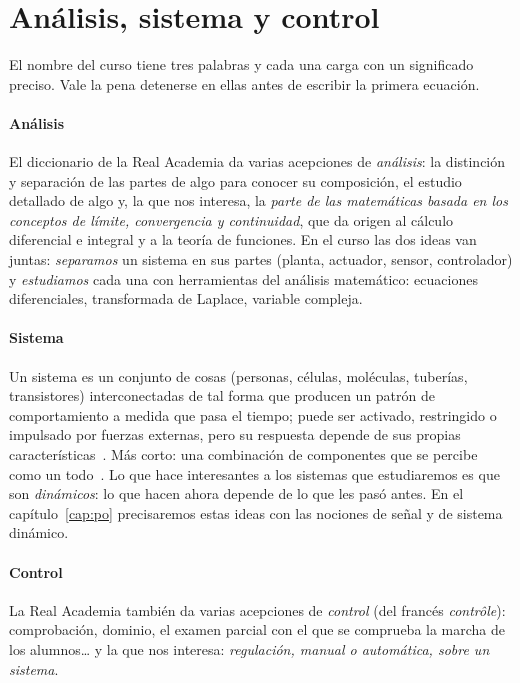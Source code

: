 \section{Análisis, sistema y control}
\label{sec:in-palabras}

El nombre del curso tiene tres palabras y cada una carga con un significado preciso. Vale la pena detenerse en ellas antes de escribir la primera ecuación.

\paragraph{Análisis}
El diccionario de la Real Academia da varias acepciones de \emph{análisis}: la distinción y separación de las partes de algo para conocer su composición, el estudio detallado de algo y, la que nos interesa, la \emph{parte de las matemáticas basada en los conceptos de límite, convergencia y continuidad}, que da origen al cálculo diferencial e integral y a la teoría de funciones. En el curso las dos ideas van juntas: \emph{separamos} un sistema en sus partes (planta, actuador, sensor, controlador) y \emph{estudiamos} cada una con herramientas del análisis matemático: ecuaciones diferenciales, transformada de Laplace, variable compleja.

\paragraph{Sistema}
Un sistema es un conjunto de cosas (personas, células, moléculas, tuberías, transistores) interconectadas de tal forma que producen un patrón de comportamiento a medida que pasa el tiempo; puede ser activado, restringido o impulsado por fuerzas externas, pero su respuesta depende de sus propias características~\citep{MeWr08}. Más corto: una combinación de componentes que se percibe como un todo~\citep{HaCh08}. Lo que hace interesantes a los sistemas que estudiaremos es que son \emph{dinámicos}: lo que hacen ahora depende de lo que les pasó antes. En el capítulo~\ref{cap:po} precisaremos estas ideas con las nociones de señal y de sistema dinámico.

\paragraph{Control}
La Real Academia también da varias acepciones de \emph{control} (del francés \emph{contrôle}): comprobación, dominio, el examen parcial con el que se comprueba la marcha de los alumnos\ldots{} y la que nos interesa: \emph{regulación, manual o automática, sobre un sistema}.

